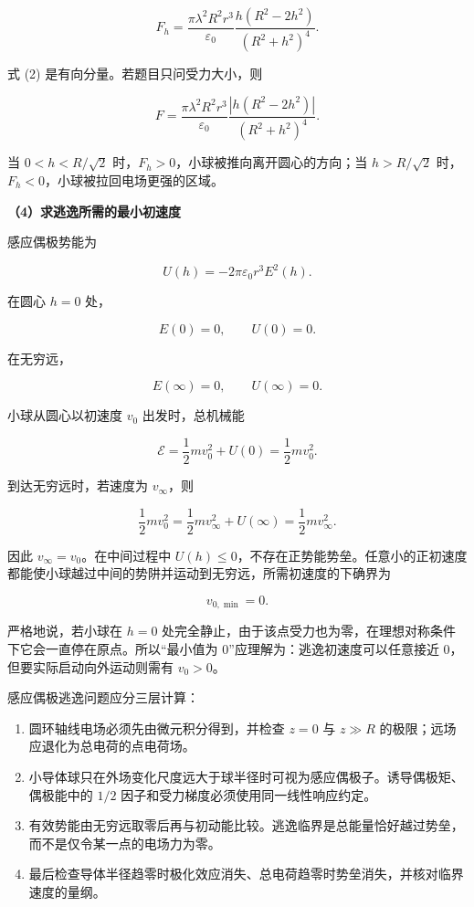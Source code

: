 \documentclass[12pt,a4paper,UTF8]{ctexart}
\newcommand{\tightlist}{\setlength{\itemsep}{0pt}\setlength{\parskip}{0pt}}
\begin{document}
\[
\boxed{
F_h=
\frac{\pi\lambda^2R^2r^3}{\varepsilon_0}
\frac{h(R^2-2h^2)}{(R^2+h^2)^4}
}. \tag{2}
\]

式 (2) 是有向分量。若题目只问受力大小，则

\[
\boxed{
F=
\frac{\pi\lambda^2R^2r^3}{\varepsilon_0}
\frac{|h(R^2-2h^2)|}{(R^2+h^2)^4}
}.
\]

当 \(0<h<R/\sqrt2\) 时，\(F_h>0\)，小球被推向离开圆心的方向；当
\(h>R/\sqrt2\) 时，\(F_h<0\)，小球被拉回电场更强的区域。

\textbf{（4）求逃逸所需的最小初速度}

感应偶极势能为

\[
U(h)=-2\pi\varepsilon_0r^3E^2(h).
\]

在圆心 \(h=0\) 处，

\[E(0)=0,
\qquad U(0)=0.
\]

在无穷远，

\[E(\infty)=0,
\qquad U(\infty)=0.
\]

小球从圆心以初速度 \(v_0\) 出发时，总机械能

\[
\mathcal E=\frac12mv_0^2+U(0)=\frac12mv_0^2.
\]

到达无穷远时，若速度为 \(v_\infty\)，则

\[
\frac12mv_0^2
=\frac12mv_\infty^2+U(\infty)
=\frac12mv_\infty^2.
\]

因此 \(v_\infty=v_0\)。在中间过程中
\(U(h)\le0\)，不存在正势能势垒。任意小的正初速度都能使小球越过中间的势阱并运动到无穷远，所需初速度的下确界为

\[
\boxed{v_{0,\min}=0}.
\]

严格地说，若小球在 \(h=0\)
处完全静止，由于该点受力也为零，在理想对称条件下它会一直停在原点。所以``最小值为
0''应理解为：逃逸初速度可以任意接近 0，但要实际启动向外运动则需有
\(v_0>0\)。

感应偶极逃逸问题应分三层计算：

\begin{enumerate}
\def\labelenumi{\arabic{enumi}.}
\tightlist
\item
  圆环轴线电场必须先由微元积分得到，并检查 \(z=0\) 与 \(z\gg R\)
  的极限；远场应退化为总电荷的点电荷场。
\item
  小导体球只在外场变化尺度远大于球半径时可视为感应偶极子。诱导偶极矩、偶极能中的
  \(1/2\) 因子和受力梯度必须使用同一线性响应约定。
\item
  有效势能由无穷远取零后再与初动能比较。逃逸临界是总能量恰好越过势垒，而不是仅令某一点的电场力为零。
\item
  最后检查导体半径趋零时极化效应消失、总电荷趋零时势垒消失，并核对临界速度的量纲。
\end{enumerate}
\end{document}
